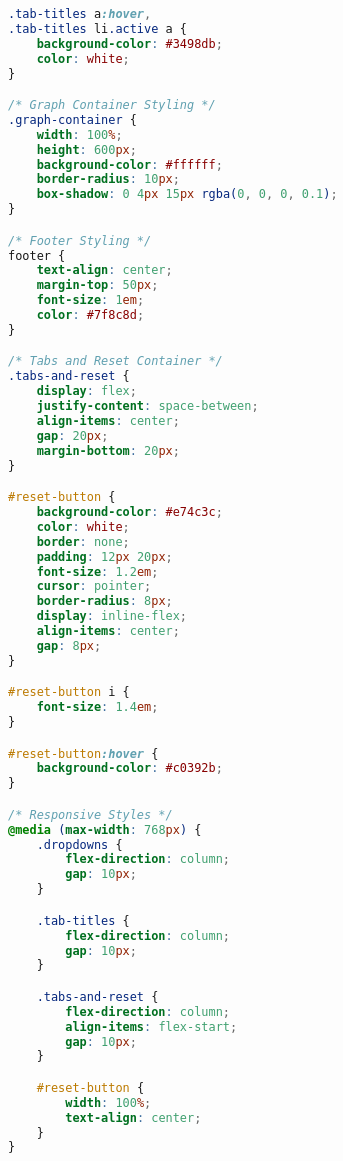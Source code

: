 \begin{lstlisting}[language=CSS, caption=style.css, frame=single]
.tab-titles a:hover,
.tab-titles li.active a {
    background-color: #3498db;
    color: white;
}

/* Graph Container Styling */
.graph-container {
    width: 100%;
    height: 600px;
    background-color: #ffffff;
    border-radius: 10px;
    box-shadow: 0 4px 15px rgba(0, 0, 0, 0.1);
}

/* Footer Styling */
footer {
    text-align: center;
    margin-top: 50px;
    font-size: 1em;
    color: #7f8c8d;
}

/* Tabs and Reset Container */
.tabs-and-reset {
    display: flex;
    justify-content: space-between;
    align-items: center;
    gap: 20px;
    margin-bottom: 20px;
}

#reset-button {
    background-color: #e74c3c;
    color: white;
    border: none;
    padding: 12px 20px;
    font-size: 1.2em;
    cursor: pointer;
    border-radius: 8px;
    display: inline-flex;
    align-items: center;
    gap: 8px;
}

#reset-button i {
    font-size: 1.4em;
}

#reset-button:hover {
    background-color: #c0392b;
}

/* Responsive Styles */
@media (max-width: 768px) {
    .dropdowns {
        flex-direction: column;
        gap: 10px;
    }

    .tab-titles {
        flex-direction: column;
        gap: 10px;
    }

    .tabs-and-reset {
        flex-direction: column;
        align-items: flex-start;
        gap: 10px;
    }

    #reset-button {
        width: 100%;
        text-align: center;
    }
} 
\end{lstlisting}